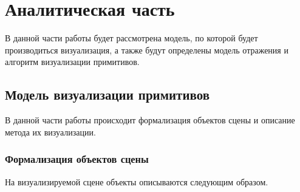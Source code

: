
\chapter{Аналитическая часть}
В данной части работы будет рассмотрена модель, по которой будет производиться
визуализация, а также будут определены модель отражения и алгоритм визуализации примитивов.
\section{Модель визуализации примитивов}
В данной части работы происходит формализация объектов сцены и описание метода их визуализации.

\subsection{Формализация объектов сцены}
\label{sec:obj_formalasation}
На визуализируемой сцене объекты описываются следующим образом.
